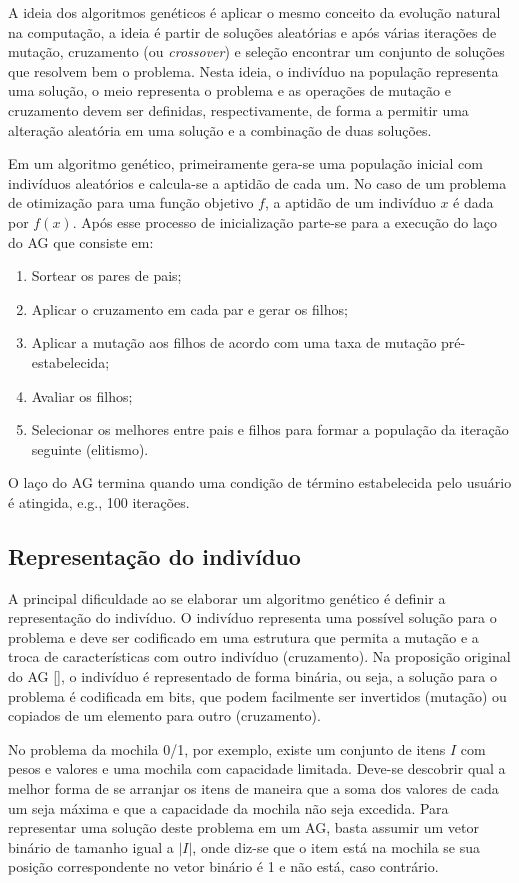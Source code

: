 A ideia dos algoritmos genéticos é aplicar o mesmo conceito da evolução natural na computação, a ideia é partir de soluções aleatórias e após várias iterações de mutação, cruzamento (ou \textit{crossover}) e seleção encontrar um conjunto de soluções que resolvem bem o problema. Nesta ideia, o indivíduo na população representa uma solução, o meio representa o problema e as operações de mutação e cruzamento devem ser definidas, respectivamente, de forma a permitir uma alteração aleatória em uma solução e a combinação de duas soluções.

Em um algoritmo genético, primeiramente gera-se uma população inicial com indivíduos aleatórios e calcula-se a aptidão de cada um. No caso de um problema de otimização para uma função objetivo $f$, a aptidão de um indivíduo $x$ é dada por $f(x)$. Após esse processo de inicialização parte-se para a execução do laço do AG que consiste em:

\begin{enumerate}  
	\item Sortear os pares de pais; 
	\item Aplicar o cruzamento em cada par e gerar os filhos; 
	\item Aplicar a mutação aos filhos de acordo com uma taxa de mutação pré-estabelecida;
	\item Avaliar os filhos;
	\item Selecionar os melhores entre pais e filhos para formar a população da iteração seguinte (elitismo).
\end{enumerate}

O laço do AG termina quando uma condição de término estabelecida pelo usuário é atingida, e.g., 100 iterações.

\subsection{Representação do indivíduo}
A principal dificuldade ao se elaborar um algoritmo genético é definir a representação do indivíduo. O indivíduo representa uma possível solução para o problema e deve ser codificado em uma estrutura que permita a mutação e a troca de características com outro indivíduo (cruzamento). Na proposição original do AG [], o indivíduo é representado de forma binária, ou seja, a solução para o problema é codificada em bits, que podem facilmente ser invertidos (mutação) ou copiados de um elemento para outro (cruzamento).

No problema da mochila 0/1, por exemplo, existe um conjunto de itens $I$ com pesos e valores e uma mochila com capacidade limitada. Deve-se descobrir qual a melhor forma de se arranjar os itens de maneira que a soma dos valores de cada um seja máxima e que a capacidade da mochila não seja excedida. Para representar uma solução deste problema em um AG, basta assumir um vetor binário de tamanho igual a $|I|$, onde diz-se que o item está na mochila se sua posição correspondente no vetor binário é 1 e não está, caso contrário.

